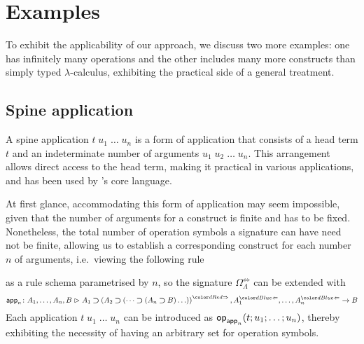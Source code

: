 
\section{Examples}\label{sec:example}
To exhibit the applicability of our approach, we discuss two more examples:
one has infinitely many operations and the other includes many more constructs than simply typed $\lambda$-calculus, exhibiting the practical side of a general treatment.

\subsection{Spine application}\label{subsec:spine}
A spine application $t\;u_1\;\ldots\;u_n$ is a form of application that consists of a head term $t$ and an indeterminate number of arguments $u_1\;u_2\;\dots\;u_n$.
This arrangement allows direct access to the head term, making it practical in various applications, and has been used by \Agda's core language. %

At first glance, accommodating this form of application may seem impossible, given that the number of arguments for a construct is finite and has to be fixed.
Nonetheless, the total number of operation symbols a signature can have need not be finite, allowing us to establish a corresponding construct for each number $n$ of arguments, i.e.\ viewing the following rule
\bgroup
\small
  \begin{mathpar}
  \end{mathpar}
\egroup
as a rule schema parametrised by $n$, so the signature $\Omega_{\Lambda}^{\Leftrightarrow}$ can be extended with 
\[
  \aritysymbol{\mathsf{app}_n}{A_1,\ldots, A_n, B}{A_1 \bto \left(A_2 \bto \left(\dots \bto \left(A_n \bto B\right)\ldots\right)\right)^{\syn}, A_1^{\chk}, \ldots, A_n^{\chk}}{B}
\]
Each application $t\;u_1\;\ldots\;u_n$ can be introduced as $\tmOp_{\mathsf{app}_n}(t; u_1; \ldots; u_n)$, thereby exhibiting the necessity of having an arbitrary set for operation symbols.

